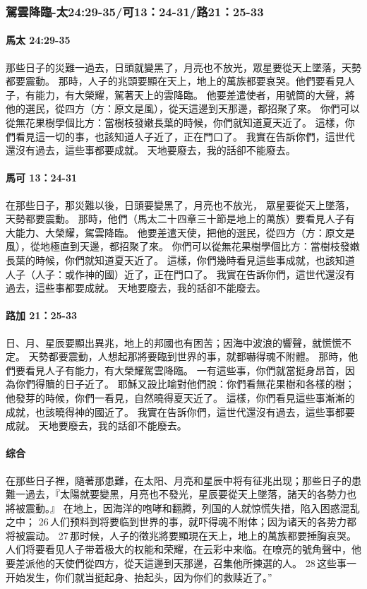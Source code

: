 \subsubsection{駕雲降臨-太24:29-35/可13：24-31/路21：25-33}
\paragraph{馬太 24:29-35}
那些日子的災難一過去，日頭就變黑了，月亮也不放光，眾星要從天上墜落，天勢都要震動。
那時，人子的兆頭要顯在天上，地上的萬族都要哀哭。他們要看見人子，有能力，有大榮耀，駕著天上的雲降臨。
他要差遣使者，用號筒的大聲，將他的選民，從四方（方：原文是風），從天這邊到天那邊，都招聚了來。
你們可以從無花果樹學個比方：當樹枝發嫩長葉的時候，你們就知道夏天近了。
這樣，你們看見這一切的事，也該知道人子近了，正在門口了。
我實在告訴你們，這世代還沒有過去，這些事都要成就。
天地要廢去，我的話卻不能廢去。


\paragraph{馬可 13：24-31}
在那些日子，那災難以後，日頭要變黑了，月亮也不放光，
眾星要從天上墜落，天勢都要震動。
那時，他們（馬太二十四章三十節是地上的萬族）要看見人子有大能力、大榮耀，駕雲降臨。
他要差遣天使，把他的選民，從四方（方：原文是風），從地極直到天邊，都招聚了來。
你們可以從無花果樹學個比方：當樹枝發嫩長葉的時候，你們就知道夏天近了。
這樣，你們幾時看見這些事成就，也該知道人子（人子：或作神的國）近了，正在門口了。
我實在告訴你們，這世代還沒有過去，這些事都要成就。
天地要廢去，我的話卻不能廢去。
\paragraph{路加 21：25-33}
日、月、星辰要顯出異兆，地上的邦國也有困苦；因海中波浪的響聲，就慌慌不定。
天勢都要震動，人想起那將要臨到世界的事，就都嚇得魂不附體。
那時，他們要看見人子有能力，有大榮耀駕雲降臨。
一有這些事，你們就當挺身昂首，因為你們得贖的日子近了。
耶穌又設比喻對他們說：你們看無花果樹和各樣的樹；他發芽的時候，你們一看見，自然曉得夏天近了。
這樣，你們看見這些事漸漸的成就，也該曉得神的國近了。
我實在告訴你們，這世代還沒有過去，這些事都要成就。
天地要廢去，我的話卻不能廢去。
\paragraph{综合}
在那些日子裡，隨著那患難，在太阳、月亮和星辰中将有征兆出现；那些日子的患難一過去，『太陽就要變黑，月亮也不發光，星辰要從天上墜落，諸天的各勢力也將被震動。』
在地上，因海洋的咆哮和翻腾，列国的人就惊慌失措，陷入困惑混乱之中； 26 人们预料到将要临到世界的事，就吓得魂不附体；因为诸天的各势力都将被震动。 27 那时候，人子的徵兆將要顯現在天上，地上的萬族都要捶胸哀哭。人们将要看见人子带着极大的权能和荣耀，在云彩中来临。在嘹亮的號角聲中，他要差派他的天使們從四方，從天這邊到天那邊，召集他所揀選的人。 28 这些事一开始发生，你们就当挺起身、抬起头，因为你们的救赎近了。”

